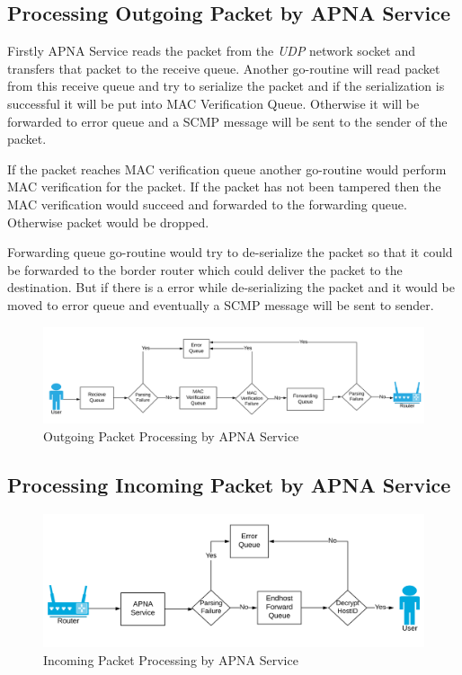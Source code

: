 \subsection{Processing Outgoing Packet by APNA Service}
Firstly APNA Service reads the packet from the \textit{UDP} network socket and transfers that packet to the receive queue. Another go-routine will read packet from this receive queue and try to serialize the packet and if the serialization is successful it will be put into MAC Verification Queue. Otherwise it will be forwarded to error queue and a SCMP message will be sent to the sender of the packet.

If the packet reaches MAC verification queue another go-routine would perform MAC verification for the packet. If the packet has not been tampered then the MAC verification would succeed and forwarded to the forwarding queue. Otherwise packet would be dropped.

Forwarding queue go-routine would try to de-serialize the packet so that it could be forwarded to the border router which could deliver the packet to the destination. But if there is a error while de-serializing the packet and it would be moved to error queue and eventually a SCMP message will be sent to sender.
\begin{figure}[th!!]
\centering
\hspace*{-2cm}\includegraphics[scale=0.3]{Figures/svc.png}
\decoRule
\caption[APNA Service Outgoing Packet]{Outgoing Packet Processing by APNA Service}
\label{fig:perf_ephid}
\end{figure}

\subsection{Processing Incoming Packet by APNA Service}
\begin{figure}[th!!]
\centering
\includegraphics[scale=0.24]{Figures/svc_out.png}
\decoRule
\caption[APNA Service Incoming Packet]{Incoming Packet Processing by APNA Service}
\label{fig:perf_ephid}
\end{figure}

